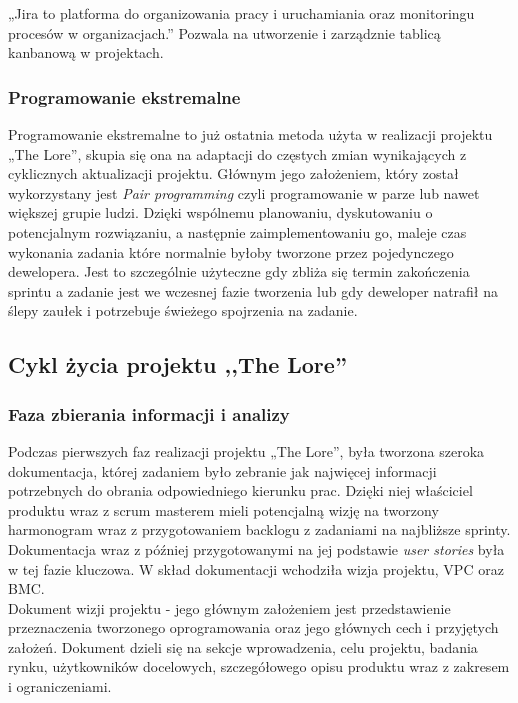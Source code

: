\documentclass[oneside,polski,logo]{amuthesis}
\begin{document}
„Jira to platforma do organizowania pracy i uruchamiania oraz monitoringu procesów w organizacjach.”  \cite{jira} Pozwala na utworzenie i zarządznie tablicą kanbanową w projektach.

\subsubsection{Programowanie ekstremalne}

Programowanie ekstremalne to już ostatnia metoda użyta w realizacji projektu „The Lore”, skupia się ona na adaptacji do częstych zmian wynikających z cyklicznych aktualizacji projektu. Głównym jego założeniem, który został wykorzystany jest \emph{Pair programming} czyli programowanie w parze lub nawet większej grupie ludzi. Dzięki wspólnemu planowaniu, dyskutowaniu o potencjalnym rozwiązaniu, a następnie zaimplementowaniu go, maleje czas wykonania zadania które normalnie byłoby tworzone przez pojedynczego dewelopera. Jest to szczególnie użyteczne gdy zbliża się termin zakończenia sprintu a zadanie jest we wczesnej fazie tworzenia lub gdy deweloper natrafił na ślepy zaułek i potrzebuje świeżego spojrzenia na zadanie. \\

\subsection{Cykl życia projektu ,,The Lore''}

\subsubsection{Faza zbierania informacji i analizy}

Podczas pierwszych faz realizacji projektu „The Lore”, była tworzona szeroka dokumentacja, której zadaniem było zebranie jak najwięcej informacji potrzebnych do obrania odpowiedniego kierunku prac. Dzięki niej właściciel produktu wraz z scrum masterem mieli potencjalną wizję na tworzony harmonogram wraz z przygotowaniem backlogu z zadaniami na najbliższe sprinty. Dokumentacja wraz z później przygotowanymi na jej podstawie \emph{user stories} była w tej fazie kluczowa. W skład dokumentacji wchodziła wizja projektu, VPC oraz BMC.\\

Dokument wizji projektu - jego głównym założeniem jest przedstawienie przeznaczenia tworzonego oprogramowania oraz jego głównych cech i przyjętych założeń. Dokument dzieli się na sekcje wprowadzenia, celu projektu, badania rynku, użytkowników docelowych, szczegółowego opisu produktu wraz z zakresem i ograniczeniami. \\
\end{document}

